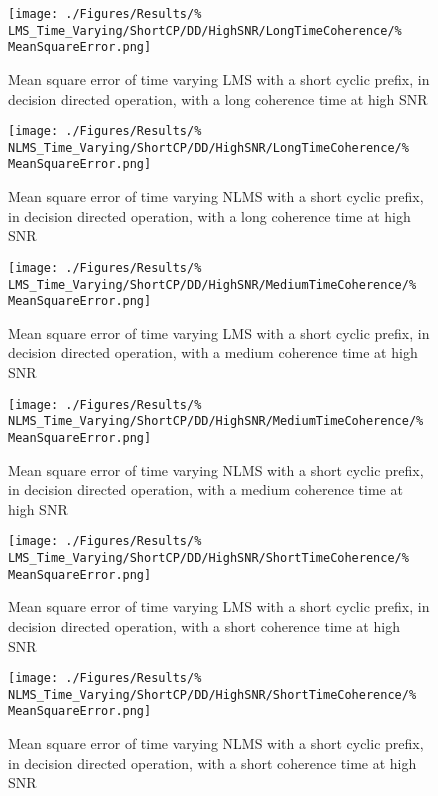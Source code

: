 \begin{figure}[ht]
	\centering
	\begin{minipage}{0.49\textwidth}
		\centering
		\texttt{[image: ./Figures/Results/\%
	LMS\_Time\_Varying/ShortCP/DD/HighSNR/LongTimeCoherence/\%
	MeanSquareError.png]}
		\caption{Mean square error of time varying LMS with a 
		short cyclic prefix, in decision directed operation, 
		with a long coherence time at high SNR}
	\end{minipage}
	\begin{minipage}{0.49\textwidth}
		\centering
		\texttt{[image: ./Figures/Results/\%
	NLMS\_Time\_Varying/ShortCP/DD/HighSNR/LongTimeCoherence/\%
	MeanSquareError.png]}
		\caption{Mean square error of time varying NLMS with 
		a short cyclic prefix, in decision directed 
		operation, with a long coherence time at high SNR}
	\end{minipage}
\end{figure}

\begin{figure}[ht]
	\centering
	\begin{minipage}{0.49\textwidth}
		\centering
		\texttt{[image: ./Figures/Results/\%
	LMS\_Time\_Varying/ShortCP/DD/HighSNR/MediumTimeCoherence/\%
	MeanSquareError.png]}
		\caption{Mean square error of time varying LMS with a 
		short cyclic prefix, in decision directed operation, 
		with a medium coherence time at high SNR}
	\end{minipage}
	\begin{minipage}{0.49\textwidth}
		\centering
		\texttt{[image: ./Figures/Results/\%
	NLMS\_Time\_Varying/ShortCP/DD/HighSNR/MediumTimeCoherence/\%
	MeanSquareError.png]}
		\caption{Mean square error of time varying NLMS with 
		a short cyclic prefix, in decision directed 
		operation, with a medium coherence time at high SNR}
	\end{minipage}
\end{figure}

\begin{figure}[ht]
	\centering
	\begin{minipage}{0.49\textwidth}
		\centering
		\texttt{[image: ./Figures/Results/\%
	LMS\_Time\_Varying/ShortCP/DD/HighSNR/ShortTimeCoherence/\%
	MeanSquareError.png]}
		\caption{Mean square error of time varying LMS with a 
		short cyclic prefix, in decision directed operation, 
		with a short coherence time at high SNR}
	\end{minipage}
	\begin{minipage}{0.49\textwidth}
		\centering
		\texttt{[image: ./Figures/Results/\%
	NLMS\_Time\_Varying/ShortCP/DD/HighSNR/ShortTimeCoherence/\%
	MeanSquareError.png]}
		\caption{Mean square error of time varying NLMS with 
		a short cyclic prefix, in decision directed 
		operation, with a short coherence time at high SNR}
		\label{fig:NLMS-Short-High-Directed-Short}
	\end{minipage}
\end{figure}

